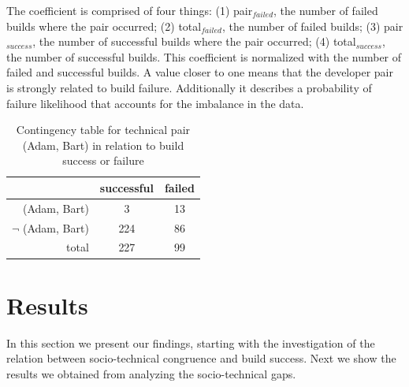 \documentclass{sig-alternate}
\begin{document}
The coefficient is comprised of four things: (1) pair$_{failed}$, the number of failed builds where the pair occurred; (2) total$_{failed}$, the number of failed builds; (3) pair$_{success}$, the number of successful builds where the pair occurred; (4) total$_{success}$, the number of successful builds.
This coefficient is normalized with the number of failed and successful builds.
A value closer to one means that the developer pair is strongly related to build
failure. Additionally it describes a probability of failure likelihood that accounts for the imbalance in the data.




\begin{table}[t]
\centering%
\begin{tabular}{rcc}
\toprule
 & successful & failed  \\
 \midrule
(Adam, Bart) & 3 & 13 \\
$\neg$ (Adam, Bart) & 224 & 86\\
\midrule
total&227&99\\\bottomrule
\end{tabular}
\caption{Contingency table for technical pair (Adam, Bart) in relation to build
success or failure}
\label{tab:contingencytable}
\end{table}












\section{Results}
In this section we present our findings, starting with the investigation of the relation between socio-technical congruence and build success.
Next we show the results we obtained from analyzing the socio-technical gaps.
\end{document}
